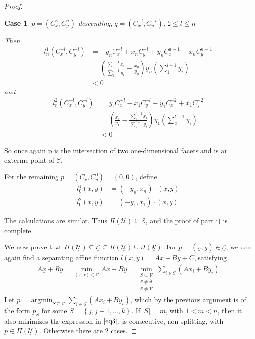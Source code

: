 \documentclass{article}
\theoremstyle{case}
\newtheorem{case}{Case}
\DeclareMathOperator*{\argmin}{argmin} %
\begin{document}
\begin{proof}
\begin{case} $p = \left( C_x^n, C_y^n \right)$ descending, $q = \left( C_x^{-l}, C_y^{-l}\right)$, $2 \leq l \leq n$

\noindent Then
\begin{align*}
l_n^1\left( C_x^{-l},C_y^{-l}\right) &= -y_nC_x^{-l} + x_nC_y^{-l} + y_nC_x^{n-1} - x_nC_y^{n-1} \\
&= \left( \frac{\sum_1^{l-1}x_i}{\sum_1^{l-1}y_i} - \frac{x_n}{y_n}\right) y_n\left( \sum_1^{l-1}y_i\right) \\
&< 0
\end{align*}
and
\begin{align*}
l_n^2\left( C_x^{-l},C_y^{-l}\right) &= y_1C_x^{-l} -x_1C_y^{-l} - y_1C_x^{-2} + x_1C_y^{-2} \\
&= \left( \frac{x_1}{y_1} - \frac{\sum_2^{l-1}x_i}{\sum_2^{l-1}y_i}\right)y_1\left( \sum_2^{l-1}y_i\right) \\
&< 0
\end{align*}
\end{case}
So once again p is the intersection of two one-dimensional facets and is an exterme point of $\mathcal{C}$.

For the remaining $p = \left( C_x^0, C_y^0\right) = \left( 0, 0\right)$, define
\begin{align*}
l_0^1\left( x,y\right) &= \left( -y_n, x_n\right) \cdot \left( x,y\right)\\
l_0^2\left( x,y\right) &= \left( -y_1, x_1\right) \cdot \left( x,y\right)
\end{align*}

The calculations are similar. Thus $\Pi \left( \mathcal{U}\right) \subseteq \mathcal{E}$, and the proof of part i) is complete.

We now prove that $\Pi\left( \mathcal{\underline{U}}\right) \subseteq \underline{\mathcal{E}} \subseteq \Pi\left( \mathcal{\underline{U}}\right) \cup \Pi\left( \mathcal{\underline{S}}\right)$. For $\underline{p} = \left( \underline{x}, \underline{y} \right) \in \underline{\mathcal{E}}$, we can again find a separating affine function $l\left( x,y\right) = Ax + By + C$, satisfying
\begin{align} \label{eq6}
A\underline{x} + B\underline{y} = \min_{(x,y) \in \underline{\mathcal{C}}} Ax + By =\min_{\substack{S \subseteq \mathcal{V} \\ S \neq \emptyset \\ S \neq \mathcal{V}}} \sum_{i \in S} \left( Ax_i + By_i\right)
\end{align}
Let $p = \argmin_{S \subseteq \mathcal{V}} \sum_{i \in S} \left( Ax_i + By_i\right)$, which by the previous argument is of the form $p_S$ for some $S = \left\lbrace j, j+1, \dots, k\right\rbrace$. If $\vert S \vert = m$, with $1 < m < n$, then it also minimizes the expression in $\ref{eq3}$, is consecutive, non-splitting, with $p \in \Pi\left( \mathcal{\underline{U}}\right)$. Otherwise there are 2 cases.


\end{proof}
\end{document}
